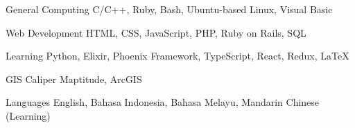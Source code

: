 

\begin{cvskills}

  \cvskill
    {General Computing} %
    {C/C++, Ruby, Bash, Ubuntu-based Linux, Visual Basic} %

  \cvskill
    {Web Development} %
    {HTML, CSS, JavaScript, PHP, Ruby on Rails, SQL} %
    
  \cvskill
    {Learning} %
    {Python, Elixir, Phoenix Framework, TypeScript, React, Redux, \LaTeX} %
    
  \cvskill
    {GIS} %
    {Caliper Maptitude, ArcGIS} %

  \cvskill
    {Languages} %
    {English, Bahasa Indonesia, Bahasa Melayu, Mandarin Chinese (Learning)} %

\end{cvskills}
